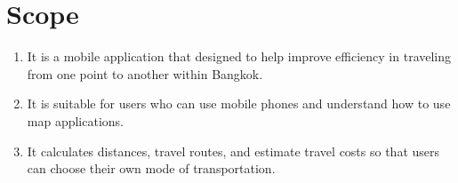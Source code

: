 \newpage
\section{Scope}
\begin{enumerate}
    \item It is a mobile application that designed to help improve efficiency in traveling from one point to another within Bangkok.
    \item It is suitable for users who can use mobile phones and understand how to use map  applications.
    \item It calculates distances, travel routes, and estimate travel costs so that users can choose their own mode of transportation.
\end{enumerate}
